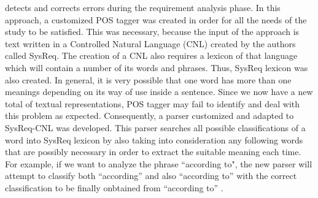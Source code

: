 detects and corrects errors during the requirement analysis phase. In this approach, a customized POS tagger was created in order for all the 
needs of the study to be satisfied. This was necessary, because the input of the approach is text written in a Controlled Natural Language (CNL) 
created by the authors called SysReq. The creation of a CNL also requires a lexicon of that language which will contain a number of its 
words and phrases. Thus, SysReq lexicon was also created. In general, it is very possible that one word has more than one meanings depending 
on its way of use inside a sentence. Since we now have a new total of textual representations, POS tagger may fail to identify and deal with 
this problem as expected. Consequently, a parser customized and adapted to SysReq-CNL was developed. This parser searches all possible 
classifications of a word into SysReq lexicon by also taking into consideration any following words that are possibly necessary in order to 
extract the suitable meaning each time. For example, if we want to analyze the phrase ``according to", the new parser will attempt to classify 
both ``according'' and also ``according to'' with the correct classification to be finally onbtained from ``according to'' \cite{carvalho2014nat2testscr}.\\

